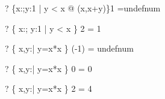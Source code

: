\begin{zed}\vdash? \{x:\nat;y:1  | y < x @ (x,x+y)\}1 =undefnum\end{zed}
\begin{zed} \vdash?   \{ x:\nat; y:1  | y < x \} 2 = 1 \end{zed}
\begin{zed} \vdash?  \{ x,y:\nat | y=x*x \} (-1) = undefnum \end{zed}
\begin{zed} \vdash?   \{ x,y:\nat | y=x*x \} 0 = 0 \end{zed}
\begin{zed} \vdash?   \{ x,y:\nat | y=x*x \} 2 = 4 \end{zed}


